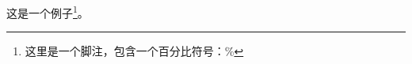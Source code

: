 \documentclass{ctexart}
\begin{document}
这是一个例子\footnote{这里是一个脚注，包含一个百分比符号：\protect\%}。
\end{document}

